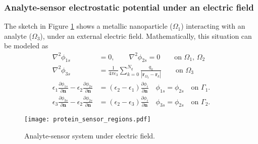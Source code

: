 

\subsubsection{Analyte-sensor electrostatic potential under an electric field}

The sketch in Figure \ref{fig:analyte-sensor} shows a metallic nanoparticle ($\Omega_1$) interacting with an analyte ($\Omega_3$), under an external electric field.
Mathematically, this situation can be modeled as
%
\begin{align} \label{eq:electrostatic_scatter_prot_sen}
\nabla^2 \phi_{1s} &= 0, \qquad \nabla^2 \phi_{2s} = 0 \qquad\text{on $\Omega_1$, $\Omega_2$} \nonumber\\
\nabla^2 \phi_{3s} &= \frac{1}{4\pi\epsilon_3} \sum_{k=0}^{N_q} \frac{q_k}{|\mathbf{r}_{\Omega_3} - \mathbf{r}_k|} \qquad\text{on $\Omega_3$} \nonumber \\
\epsilon_1\frac{\partial\phi_{1s}}{\partial \mathbf{n}} - \epsilon_2\frac{\partial\phi_{2s}}{\partial\mathbf{n}} &= (\epsilon_2-\epsilon_1)\frac{\partial\phi_i}{\partial\mathbf{n}} \quad \phi_{1s} = \phi_{2s} \quad \text{on $\Gamma_1$}. \nonumber\\
\epsilon_3\frac{\partial\phi_{3s}}{\partial \mathbf{n}} - \epsilon_2\frac{\partial\phi_{2s}}{\partial\mathbf{n}} &= (\epsilon_2-\epsilon_3)\frac{\partial\phi_i}{\partial\mathbf{n}} \quad \phi_{3s} = \phi_{2s} \quad \text{on $\Gamma_2$}.
\end{align}
%

\begin{figure}[h] %
    \centering
    \texttt{[image: protein\_sensor\_regions.pdf]} 
    \caption{Analyte-sensor system under electric field.}
    \label{fig:analyte-sensor}
 \end{figure}

